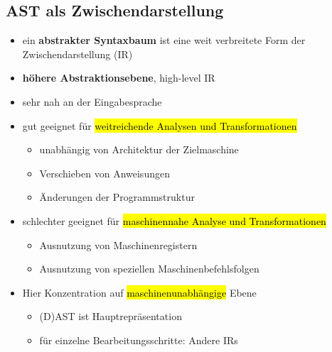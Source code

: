 \documentclass[a4paper, 10pt]{article}
\begin{document}
\subsection{AST als Zwischendarstellung}
\begin{itemize}
    \item ein \textbf{abstrakter Syntaxbaum} ist eine weit verbreitete Form der Zwischendarstellung (IR)
    \item \textbf{höhere Abstraktionsebene}, high-level IR
    \item sehr nah an der Eingabesprache
    \item gut geeignet für \hl{weitreichende Analysen und Transformationen}
    \begin{itemize}
        \item unabhängig von Architektur der Zielmaschine
        \item Verschieben von Anweisungen
        \item Änderungen der Programmstruktur
    \end{itemize}

    \item schlechter geeignet für \hl{maschinennahe Analyse und Transformationen}
    \begin{itemize}
        \item Ausnutzung von Maschinenregistern
        \item Ausnutzung von speziellen Maschinenbefehlsfolgen
    \end{itemize}
    \item Hier Konzentration auf \hl{maschinenunabhängige} Ebene
    \begin{itemize}
        \item (D)AST ist Hauptrepräsentation
        \item für einzelne Bearbeitungsschritte: Andere IRs
    \end{itemize}
\end{itemize}
\end{document}

